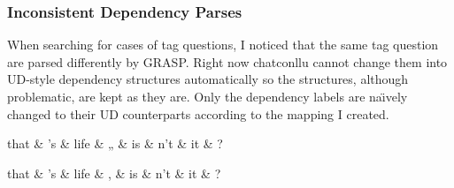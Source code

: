 \subsubsection{Inconsistent Dependency Parses}

When searching for cases of tag questions, I noticed that the same tag question are parsed differently by GRASP. Right now chatconllu cannot change them into UD-style dependency structures automatically so the structures, although problematic, are kept as they are. Only the dependency labels are na\"{\i}vely changed to their UD counterparts according to the mapping I created. \\

\begin{minipage}{\widefigurewidth}
\begin{dependency}[edge slant=3pt]
	\begin{deptext}[column sep=1cm]
	that \& 's \& life \& „ \& is \& n't \& it \& ?\\
	\end{deptext}
\end{dependency}
\end{minipage}
\label{fig:taggr}
\vspace*{2cm}
\begin{minipage}{\linewidth}
\begin{dependency}[edge slant=3pt]
	\begin{deptext}[column sep=1cm]
	that \& 's \& life \& , \& is \& n't \& it \& ?\\
	\end{deptext}
\end{dependency}
\end{minipage}
\label{fig:tagdeprel}

